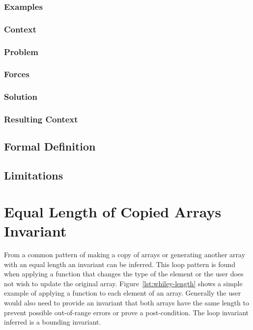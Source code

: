\subsubsection{Examples}
\subsubsection{Context}
\subsubsection{Problem}
\subsubsection{Forces}
\subsubsection{Solution}
\subsubsection{Resulting Context}

\subsection{Formal Definition}

\subsection{Limitations}

\section{Equal Length of Copied Arrays Invariant}


From a common pattern of making a copy of arrays or generating another array
with an equal length an invariant can be inferred.
This loop pattern is found when applying a function that changes the type of
the element or the user does not wish to update the original array.
Figure~\ref{lst:whiley-length} shows a simple example of applying a function
 to each element of an array.
Generally the user would also need to provide an invariant that both arrays
have the same length to prevent possible out-of-range errors or prove a
post-condition.
The loop invariant inferred is a bounding invariant.

